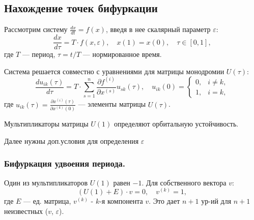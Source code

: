 	\subsection{Нахождение точек бифуркации}
	
	Рассмотрим систему \(\frac{d x}{d t} = f(x)\), введя в нее скалярный параметр \(\varepsilon\):
	\begin{equation}
		\frac{dx}{d\tau} = T \cdot f(x, \varepsilon), \quad x(1) = x(0), \quad \tau \in [0,1],
	\end{equation}
	где \(T\) — период, \(\tau = t/T\) — нормированное время. 
	\par
	Система решается совместно с уравнениями для матрицы монодромии \(U(\tau)\):
	\begin{equation}
		\frac{du_{ik}(\tau)}{d\tau} = T \cdot \sum_{s=1}^n \frac{\partial f^{(i)}}{\partial x^{(s)}} u_{sk}(\tau), \quad u_{ik}(0) = \begin{cases} 
			0, & i \neq k, \\
			1, & i = k,
		\end{cases}
	\end{equation}
	где \(u_{ik}(\tau) = \frac{\partial x^{(i)}(\tau)}{\partial x^{(k)}(0)}\) — элементы матрицы \(U(\tau)\).
	
	Мультипликаторы матрицы \(U(1)\) определяют орбитальную устойчивость.
	\par
	Далее нужны доп.условия для определения \(\varepsilon\)
	\newpage
	\subsubsection{Бифуркация удвоения периода.} 
	\vspace{-0.5em}
	Один из мультипликаторов \(U(1)\) равен \(-1\). Для собственного вектора \(v\):
	\begin{equation}
		(U(1) + E) \cdot v = 0, \quad v^{(k)} = 1,
	\end{equation}
	где \(E\) — ед. матрица, \(v^{(k)}\) - \(k\)-я компонента \(v\). Это дает \(n+1\) ур-ий для \(n+1\) неизвестных (\(v\), \(\varepsilon\)).
	\vspace{-1em}
